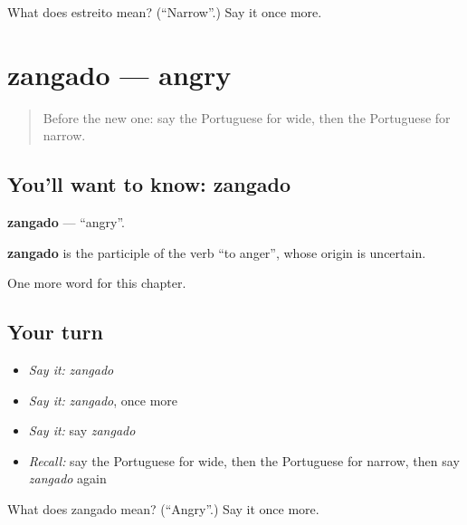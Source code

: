 \begin{tcolorbox}[breakable,colback=teal!4,colframe=teal!35!black,title={Before you move on}]
What does estreito mean? (\textquotedblleft{}Narrow\textquotedblright{}.) Say it once more.
\end{tcolorbox}
\section[zangado]{zangado — angry}

\label{lesson:PT-C127-zangado}



\begin{quote}
Before the new one: say the Portuguese for wide, then the Portuguese for narrow.
\end{quote}

\subsection*{You'll want to know: zangado}
\textbf{zangado} — \textquotedblleft{}angry\textquotedblright{}.

\begin{cousinweb}
\textbf{zangado} is the participle of the verb \textquotedblleft{}to anger\textquotedblright{}, whose origin is uncertain.
\end{cousinweb}

\begin{grammarlens}[title={What you've built}]
One more word for this chapter.
\end{grammarlens}

\subsection*{Your turn}
\begin{itemize}
\raggedright
  \item \emph{Say it:} \emph{zangado}
  \item \emph{Say it:} \emph{zangado}, once more
  \item \emph{Say it:} say \emph{zangado}
  \item \emph{Recall:} say the Portuguese for wide, then the Portuguese for narrow, then say \emph{zangado} again
\end{itemize}

\begin{tcolorbox}[breakable,colback=teal!4,colframe=teal!35!black,title={Before you move on}]
What does zangado mean? (\textquotedblleft{}Angry\textquotedblright{}.) Say it once more.
\end{tcolorbox}
